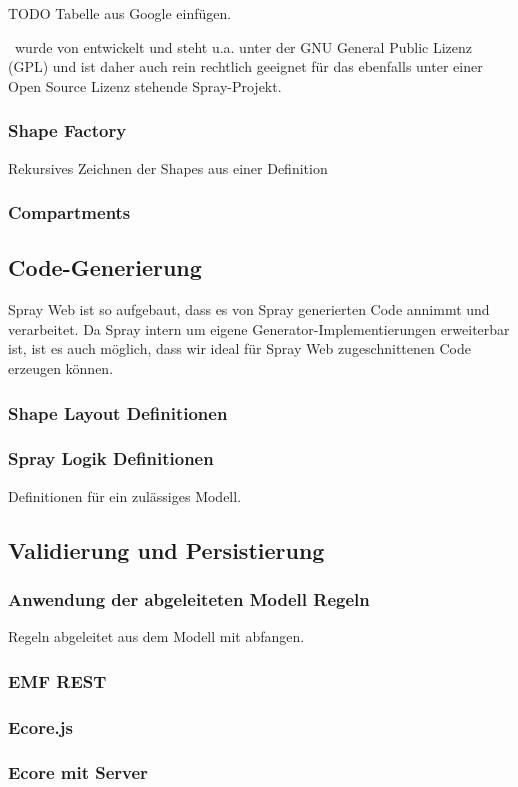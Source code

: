 TODO Tabelle aus Google einfügen.

\dd~wurde von \citep{dd} entwickelt und steht u.a. unter der GNU General
Public Lizenz (GPL) und ist daher auch rein rechtlich geeignet für
das ebenfalls unter einer Open Source Lizenz stehende Spray-Projekt.

\subsubsection{Shape Factory}

Rekursives Zeichnen der Shapes aus einer Definition

\subsubsection{Compartments}


\subsection{Code-Generierung}

Spray Web ist so aufgebaut, dass es von Spray generierten Code annimmt
und verarbeitet. Da Spray intern um eigene Generator-Implementierungen
erweiterbar ist, ist es auch möglich, dass wir ideal für Spray Web
zugeschnittenen Code erzeugen können.

\subsubsection{Shape Layout Definitionen}

\subsubsection{Spray Logik Definitionen}

Definitionen für ein zulässiges Modell.

\subsection{Validierung und Persistierung}

\subsubsection{Anwendung der abgeleiteten Modell Regeln}

Regeln abgeleitet aus dem Modell mit \dd abfangen.

\subsubsection{EMF REST}

\subsubsection{Ecore.js}

\subsubsection{Ecore mit Server}
